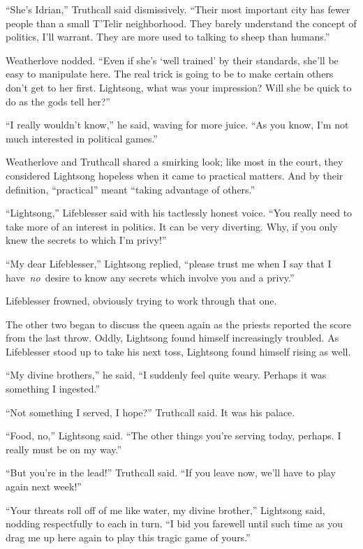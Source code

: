 “She’s Idrian,” Truthcall said dismissively. “Their most important city has fewer people than a small T’Telir neighborhood. They barely understand the concept of politics, I’ll warrant. They are more used to talking to sheep than humans.”

Weatherlove nodded. “Even if she’s ‘well trained’ by their standards, she’ll be easy to manipulate here. The real trick is going to be to make certain others don’t get to her first. Lightsong, what was your impression? Will she be quick to do as the gods tell her?”

“I really wouldn’t know,” he said, waving for more juice. “As you know, I’m not much interested in political games.”

Weatherlove and Truthcall shared a smirking look; like most in the court, they considered Lightsong hopeless when it came to practical matters. And by their definition, “practical” meant “taking advantage of others.”

“Lightsong,” Lifeblesser said with his tactlessly honest voice. “You really need to take more of an interest in politics. It can be very diverting. Why, if you only knew the secrets to which I’m privy!”

“My dear Lifeblesser,” Lightsong replied, “please trust me when I say that I have~\textit{no}~desire to know any secrets which involve you and a privy.”

Lifeblesser frowned, obviously trying to work through that one.

The other two began to discuss the queen again as the priests reported the score from the last throw. Oddly, Lightsong found himself increasingly troubled. As Lifeblesser stood up to take his next toss, Lightsong found himself rising as well.

“My divine brothers,” he said, “I suddenly feel quite weary. Perhaps it was something I ingested.”

“Not something I served, I hope?” Truthcall said. It was his palace.

“Food, no,” Lightsong said. “The other things you’re serving today, perhaps. I really must be on my way.”

“But you’re in the lead!” Truthcall said. “If you leave now, we’ll have to play again next week!”

“Your threats roll off of me like water, my divine brother,” Lightsong said, nodding respectfully to each in turn. “I bid you farewell until such time as you drag me up here again to play this tragic game of yours.”

